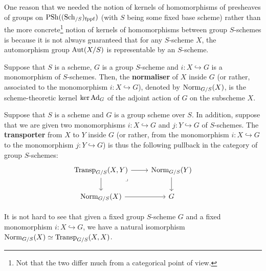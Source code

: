             \begin{remark} \label{remark: representability_of_automorphism_groups_of_schemes}
                One reason that we needed the notion of kernels of homomorphisms of presheaves of groups on $\mathrm{PSh}((\mathrm{Sch}_{/S})_{\mathrm{fppf}})$ (with $S$ being some fixed base scheme) rather than the more concrete\footnote{Not that the two differ much from a categorical point of view.} notion of kernels of homomorphisms between group $S$-schemes is because it is not always guaranteed that for any $S$-scheme $X$, the automorphism group $\mathrm{Aut}(X/S)$ is representable by an $S$-scheme. 
            \end{remark}
            \begin{definition}[Normalisers] \label{def: normalisers}
                Suppose that $S$ is a scheme, $G$ is a group $S$-scheme and $i: X \hookrightarrow G$ is a monomorphism of $S$-schemes. Then, the \textbf{normaliser} of $X$ inside $G$ (or rather, associated to the monomorphism $i: X \hookrightarrow G$), denoted by $\mathrm{Norm}_{G/S}(X)$, is the scheme-theoretic kernel $\ker \mathrm{Ad}_G$ of the adjoint action of $G$ on the subscheme $X$.
            \end{definition}
            \begin{definition}[Transporters] \label{def: transporters}
                Suppose that $S$ is a scheme and $G$ is a group scheme over $S$. In addition, suppose that we are given two monomorphisms $i: X \hookrightarrow G$ and $j: Y \hookrightarrow G$ of $S$-schemes. The \textbf{transporter} from $X$ to $Y$ inside $G$ (or rather, from the monomorphism $i: X \hookrightarrow G$ to the monomorphism $j: Y \hookrightarrow G$) is thus the following pullback in the category of group $S$-schemes:
                    $$
                        \begin{tikzcd}
                        	{\Transporter_{G/S}(X, Y)} & {\Norm_{G/S}(Y)} \\
                        	{\Norm_{G/S}(X)} & G
                        	\arrow[from=1-1, to=2-1]
                        	\arrow[from=2-1, to=2-2]
                        	\arrow[from=1-1, to=1-2]
                        	\arrow[from=1-2, to=2-2]
                        	\arrow["\lrcorner"{anchor=center, pos=0.125}, draw=none, from=1-1, to=2-2]
                        \end{tikzcd}
                    $$
            \end{definition}
            \begin{remark}
                It is not hard to see that given a fixed group $S$-scheme $G$ and a fixed monomorphism $i: X \hookrightarrow G$, we have a natural isomorphism $\mathrm{Norm}_{G/S}(X) \simeq \mathrm{Transp}_{G/S}(X, X)$. 
            \end{remark}
